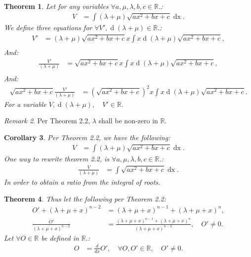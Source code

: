 \documentclass[10pt]{article}
\theoremstyle{plain}
\newtheorem{theorem}{Theorem}[section]
\newtheorem{corollary}[theorem]{Corollary}
\theoremstyle{definition}
\theoremstyle{remark}
\newtheorem{remark}[theorem]{Remark}
\begin{document}
\begin{theorem}
	Let for any variables $\forall a, \mu, \lambda, b, c \in \mathbb{R}$.:
	\begin{align*}
		V &= \int (\lambda + \mu)\sqrt{ax^2 + bx  +c} \operatorname{dx}.
	\end{align*}
	We define three equations for $\forall V', \operatorname{d}(\lambda + \mu) \in \mathbb{R}.$:
	\begin{align*}
		V' &= (\lambda + \mu)\sqrt{ax^2 + bx  +c}x \int x \operatorname{d}(\lambda + \mu)\sqrt{ax^2 + bx  +c},\\
	\end{align*}
	And:
	\begin{align*}
		\frac{V'}{(\lambda + \mu)} &= \sqrt{ax^2 + bx  +c}x \int x \operatorname{d}(\lambda + \mu)\sqrt{ax^2 + bx  +c},\\
	\end{align*}
	And:
	\begin{align*}
		\sqrt{ax^2 + bx  +c}\frac{V'}{(\lambda + \mu)} &= (\sqrt{ax^2 + bx  +c})^{2}x \int x \operatorname{d}(\lambda + \mu)\sqrt{ax^2 + bx  +c}.
	\end{align*}
	For a variable $V, \operatorname{d}(\lambda + \mu), \quad V' \in \mathbb{R}.$
\end{theorem}

\begin{remark}
	Per Theorem 2.2, $\lambda$ shall be non-zero in $\mathbb{R}.$
\end{remark}

\begin{corollary}
	Per Theorem 2.2, we have the following:
	\begin{align*}
		V &= \int (\lambda + \mu)\sqrt{ax^2 + bx  +c} \operatorname{dx}.
	\end{align*}
	One way to rewrite theorem 2.2, is $\forall a, \mu, \lambda, b, c \in \mathbb{R}$.:
	\begin{align*}
		\frac{V}{(\lambda + \mu)} &= \int \sqrt{ax^2 + bx  +c} \operatorname{dx}.
	\end{align*}
	In order to obtain a ratio from the integral of roots.
\end{corollary}

\begin{theorem}
	Thus let the following per Theorem 2.2:
	\begin{align*}
		O' + (\lambda + \mu + x)^{n-2} &= (\lambda + \mu + x)^{n-1} + (\lambda + \mu + x)^{n},\\
		\frac{O'}{(\lambda + \mu + x)^{n-2}} &= \frac{(\lambda + \mu + x)^{n-1} + (\lambda + \mu + x)^{n}}{(\lambda + \mu + x)^{n-2}}, \quad O' \neq 0.
	\end{align*}
	Let $\forall O \in \mathbb{R}$ be defined in $\mathbb{R}.$:
	\begin{align*}
		O &= \frac{d}{dx} O', \quad \forall O, O' \in \mathbb{R}, \quad O' \neq 0.
	\end{align*}
\end{theorem}
\end{document}
